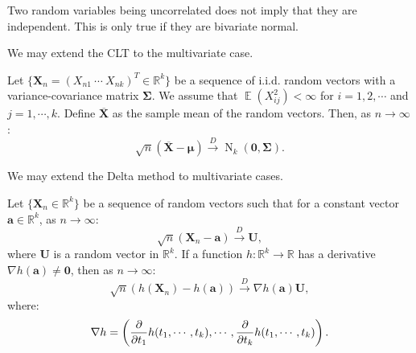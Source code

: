 \documentclass{huhtakm-template-book-v2}
\DeclareMathOperator{\E}{\mathbb{E}}
\DeclareMathOperator{\N}{N}
\begin{document}
    \begin{rem}
        Two random variables being uncorrelated does not imply that they are independent. This is only true if they are bivariate normal.
    \end{rem}
    We may extend the CLT to the multivariate case.
    \begin{thm}
        Let $\{\mathbf{X}_{n} = (X_{n1}\ \cdots\ X_{nk})^{T} \in \mathbb{R}^{k}\}$ be a sequence of i.i.d. random vectors with a variance-covariance matrix $\mathbf{\Sigma}$. We assume that $\E(X_{ij}^{2}) < \infty$ for $i = 1, 2, \cdots$ and $j = 1, \cdots, k$. Define $\mathbf{\overline{X}}$ as the sample mean of the random vectors. Then, as $n \to \infty$:
        \begin{equation*}
            \sqrt{n}(\mathbf{\overline{X}} - \boldsymbol{\mu}) \xrightarrow{D} \N_{k}(\mathbf{0}, \mathbf{\Sigma}).
        \end{equation*}
    \end{thm}
    We may extend the Delta method to multivariate cases.
    \begin{thm}
        Let $\{\mathbf{X}_{n} \in \mathbb{R}^{k}\}$ be a sequence of random vectors such that for a constant vector $\mathbf{a} \in \mathbb{R}^{k}$, as $n \to \infty$:
        \begin{equation*}
            \sqrt{n}(\mathbf{X}_{n} - \mathbf{a}) \xrightarrow{D} \mathbf{U},
        \end{equation*}
        where $\mathbf{U}$ is a random vector in $\mathbb{R}^{k}$. If a function $h: \mathbb{R}^{k} \to \mathbb{R}$ has a derivative $\nabla h(\mathbf{a}) \neq \mathbf{0}$, then as $n \to \infty$:
        \begin{equation*}
            \sqrt{n}(h(\mathbf{X}_{n}) - h(\mathbf{a})) \xrightarrow{D} \nabla h(\mathbf{a}) \mathbf{U},
        \end{equation*}
        where:
        \begin{equation*}
            \nabla h = \left(\pdv*[order=1]{h(t_{1}, \cdots, t_{k})}{t_{1}}, \cdots, \pdv*[order=1]{h(t_{1}, \cdots, t_{k})}{t_{k}}\right).
        \end{equation*}
    \end{thm}
\end{document}

